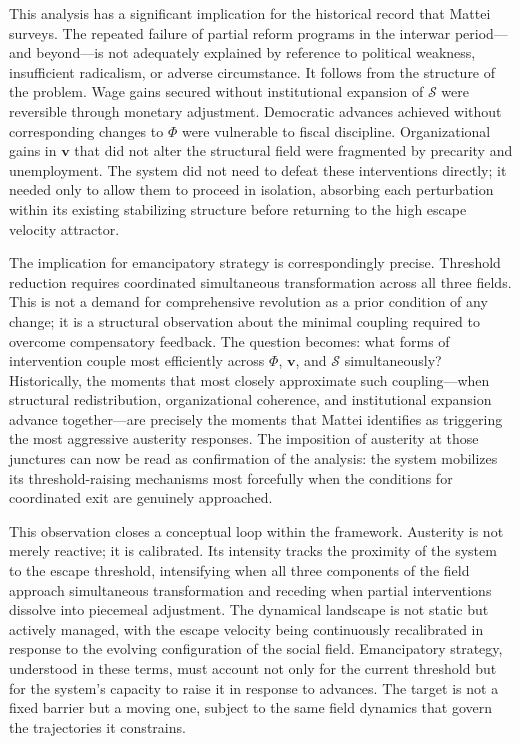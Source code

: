 \documentclass[11pt, a4paper]{article}
\begin{document}
This analysis has a significant implication for the historical record that Mattei surveys. The repeated failure of partial reform programs in the interwar period---and beyond---is not adequately explained by reference to political weakness, insufficient radicalism, or adverse circumstance. It follows from the structure of the problem. Wage gains secured without institutional expansion of $\mathcal{S}$ were reversible through monetary adjustment. Democratic advances achieved without corresponding changes to $\Phi$ were vulnerable to fiscal discipline. Organizational gains in $\mathbf{v}$ that did not alter the structural field were fragmented by precarity and unemployment. The system did not need to defeat these interventions directly; it needed only to allow them to proceed in isolation, absorbing each perturbation within its existing stabilizing structure before returning to the high escape velocity attractor.

The implication for emancipatory strategy is correspondingly precise. Threshold reduction requires coordinated simultaneous transformation across all three fields. This is not a demand for comprehensive revolution as a prior condition of any change; it is a structural observation about the minimal coupling required to overcome compensatory feedback. The question becomes: what forms of intervention couple most efficiently across $\Phi$, $\mathbf{v}$, and $\mathcal{S}$ simultaneously? Historically, the moments that most closely approximate such coupling---when structural redistribution, organizational coherence, and institutional expansion advance together---are precisely the moments that Mattei identifies as triggering the most aggressive austerity responses. The imposition of austerity at those junctures can now be read as confirmation of the analysis: the system mobilizes its threshold-raising mechanisms most forcefully when the conditions for coordinated exit are genuinely approached.

This observation closes a conceptual loop within the framework. Austerity is not merely reactive; it is calibrated. Its intensity tracks the proximity of the system to the escape threshold, intensifying when all three components of the field approach simultaneous transformation and receding when partial interventions dissolve into piecemeal adjustment. The dynamical landscape is not static but actively managed, with the escape velocity being continuously recalibrated in response to the evolving configuration of the social field. Emancipatory strategy, understood in these terms, must account not only for the current threshold but for the system's capacity to raise it in response to advances. The target is not a fixed barrier but a moving one, subject to the same field dynamics that govern the trajectories it constrains.
\end{document}
